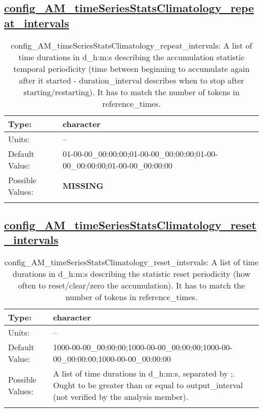 \subsection[config\_AM\_timeSeriesStatsClimatology\_repeat\_intervals]{\hyperref[sec:nm_tab_AM_timeSeriesStatsClimatology]{config\_AM\_timeSeriesStatsClimatology\_repeat\_intervals}}
\label{subsec:nm_sec_config_AM_timeSeriesStatsClimatology_repeat_intervals}
\begin{center}
\begin{longtable}{| p{2.0in} || p{4.0in} |}
    \hline
    Type: & character \\
    \hline
    Units: & -- \\
    \hline
    Default Value: & 01-00-00\_00:00:00;01-00-00\_00:00:00;01-00-00\_00:00:00;01-00-00\_00:00:00 \\
    \hline
    Possible Values: & {\bf \color{red} MISSING} \\
    \hline
    \caption{config\_AM\_timeSeriesStatsClimatology\_repeat\_intervals: A list of time durations in d\_h:m:s describing the accumulation statistic temporal periodicity (time between beginning to accumulate again after it started - duration\_interval describes when to stop after starting/restarting). It has to match the number of tokens in reference\_times.}
\end{longtable}
\end{center}
\subsection[config\_AM\_timeSeriesStatsClimatology\_reset\_intervals]{\hyperref[sec:nm_tab_AM_timeSeriesStatsClimatology]{config\_AM\_timeSeriesStatsClimatology\_reset\_intervals}}
\label{subsec:nm_sec_config_AM_timeSeriesStatsClimatology_reset_intervals}
\begin{center}
\begin{longtable}{| p{2.0in} || p{4.0in} |}
    \hline
    Type: & character \\
    \hline
    Units: & -- \\
    \hline
    Default Value: & 1000-00-00\_00:00:00;1000-00-00\_00:00:00;1000-00-00\_00:00:00;1000-00-00\_00:00:00 \\
    \hline
    Possible Values: & A list of time durations in d\_h:m:s, separated by ;. Ought to be greater than or equal to output\_interval (not verified by the analysis member). \\
    \hline
    \caption{config\_AM\_timeSeriesStatsClimatology\_reset\_intervals: A list of time durations in d\_h:m:s describing the statistic reset periodicity (how often to reset/clear/zero the accumulation). It has to match the number of tokens in reference\_times.}
\end{longtable}
\end{center}
